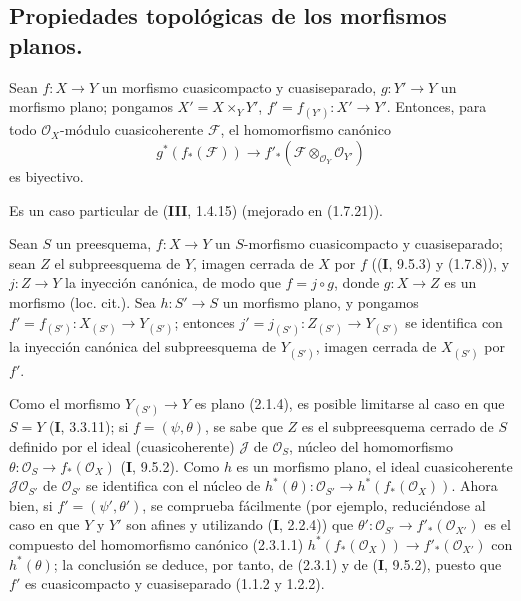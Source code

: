 \subsection{Propiedades topológicas de los morfismos planos.}
\label{subsection:IV.2.3-fr}

\begin{lemma}[2.3.1]
Sean $f:X\to Y$ un morfismo cuasicompacto y cuasiseparado,
$g:Y'\to Y$ un morfismo plano; pongamos $X'=X\times_Y Y'$,
$f'=f_{(Y')}:X'\to Y'$. Entonces, para todo $\mathcal O_X$-módulo
cuasicoherente $\mathscr F$, el homomorfismo canónico
\begin{equation}
\tag{2.3.1.1}
\label{IV.2.3.1.1-fr}
  g^*(f_*(\mathscr F))\to
  f'_*(\mathscr F\otimes_{\mathcal O_Y}\mathcal O_{Y'})
\end{equation}
es biyectivo.
\end{lemma}

Es un caso particular de (\textbf{III}, 1.4.15) (mejorado en (1.7.21)).

\begin{proposition}[2.3.2]
\label{IV.2.3.2-fr}
Sean $S$ un preesquema, $f:X\to Y$ un $S$-morfismo cuasicompacto y
cuasiseparado; sean $Z$ el subpreesquema de $Y$, imagen cerrada de $X$ por
$f$ \textup{((\textbf I, 9.5.3)} y \textup{(1.7.8))}, y $j:Z\to Y$ la inyección canónica, de
modo que $f=j\circ g$, donde $g:X\to Z$ es un morfismo
(loc. cit.). Sea $h:S'\to S$ un morfismo plano, y pongamos
$f'=f_{(S')}:X_{(S')}\to Y_{(S')}$; entonces
$j'=j_{(S')}:Z_{(S')}\to Y_{(S')}$ se identifica con la inyección canónica
del subpreesquema de $Y_{(S')}$, imagen cerrada de $X_{(S')}$ por $f'$.
\end{proposition}

Como el morfismo $Y_{(S')}\to Y$ es plano (2.1.4), es posible limitarse al caso
en que $S=Y$ (\textbf I, 3.3.11); si $f=(\psi,\theta)$, se sabe que $Z$ es el
subpreesquema cerrado de $S$ definido por el ideal (cuasicoherente)
$\mathscr J$ de $\mathcal O_S$, núcleo del homomorfismo
$\theta:\mathcal O_S\to f_*(\mathcal O_X)$ (\textbf I, 9.5.2). Como $h$ es un
morfismo plano, el ideal cuasicoherente $\mathscr J\mathcal O_{S'}$ de
$\mathcal O_{S'}$ se identifica con el núcleo de
$h^*(\theta):\mathcal O_{S'}\to h^*(f_*(\mathcal O_X))$. Ahora bien, si
$f'=(\psi',\theta')$, se comprueba fácilmente (por ejemplo, reduciéndose al
caso en que $Y$ y $Y'$ son afines y utilizando (\textbf I, 2.2.4)) que
$\theta':\mathcal O_{S'}\to f'_*(\mathcal O_{X'})$ es el compuesto del
homomorfismo canónico (2.3.1.1)
$h^*(f_*(\mathcal O_X))\to f'_*(\mathcal O_{X'})$ con $h^*(\theta)$; la
conclusión se deduce, por tanto, de (2.3.1) y de (\textbf I, 9.5.2), puesto que $f'$ es
cuasicompacto y cuasiseparado (1.1.2 y 1.2.2).

